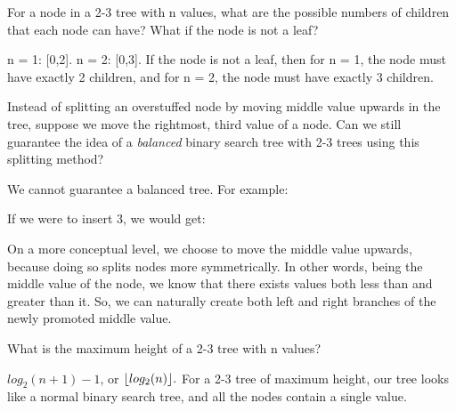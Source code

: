 \usepackage{mathtools}
\DeclarePairedDelimiter{\floor}{\lfloor}{\rfloor}

\begin{blocksection}
\begin{parts}
\item For a node in a 2-3 tree with n values, what are the possible numbers of children that each node can have? What if the node is not a leaf?

\begin{solution}[2in]
n = 1: [0,2]. n = 2: [0,3]. If the node is not a leaf, then for n = 1, the node must have exactly 2 children, and for n = 2, the node must have exactly 3 children.
\end{solution}

\item Instead of splitting an overstuffed node by moving middle value upwards in the tree, suppose we move the rightmost, third value of a node. Can we still guarantee the idea of a \textit{balanced} binary search tree with 2-3 trees using this splitting method?

\begin{solution}[2in]
We cannot guarantee a balanced tree. For example: 
\begin{center}
\end{center}
\quad
If we were to insert 3, we would get: 
\begin{center}
\end{center}

On a more conceptual level, we choose to move the middle value upwards, because doing so splits nodes more symmetrically. In other words, being the middle value of the node, we know that there exists values both less than and greater than it. So, we can naturally create both left and right branches of the newly promoted middle value.
\end{solution}

\item What is the maximum height of a 2-3 tree with n values?

\begin{solution}[2in]
$log_2(n+1) - 1$, or $\floor{log_2(n)}. $ For a 2-3 tree of maximum height, our tree looks like a normal binary search tree, and all the nodes contain a single value.
\end{solution}


\end{parts}
\end{blocksection}
